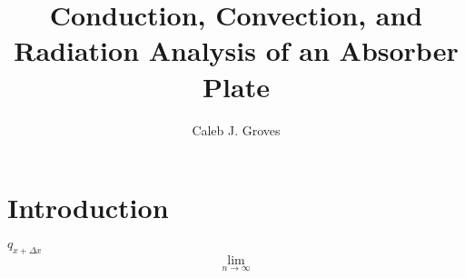 \documentclass[]{report}
\title{Conduction, Convection, and Radiation Analysis of an Absorber Plate}
\author{Caleb J. Groves}
\begin{document}
\maketitle

\begin{abstract}
\end{abstract}

\section{Introduction}
$q_{x + \Delta x} $ \\
\[\lim_{n\to\infty}\]
\end{document}
